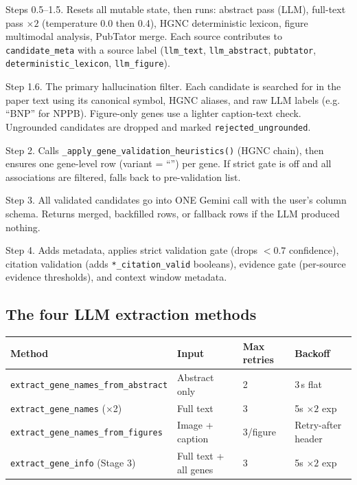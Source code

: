 \documentclass[11pt,a4paper]{article}
\begin{document}
\begin{description}[leftmargin=2em]
\item[\texttt{\_run\_candidate\_discovery()}]
  Steps 0.5--1.5. Resets all mutable state, then runs: abstract pass (LLM), full-text pass $\times 2$ (temperature 0.0 then 0.4), HGNC deterministic lexicon, figure multimodal analysis, PubTator merge. Each source contributes to \texttt{candidate\_meta} with a source label (\texttt{llm\_text}, \texttt{llm\_abstract}, \texttt{pubtator}, \texttt{deterministic\_lexicon}, \texttt{llm\_figure}).

\item[\texttt{\_run\_grounding\_check()}]
  Step 1.6. The primary hallucination filter. Each candidate is searched for in the paper text using its canonical symbol, HGNC aliases, and raw LLM labels (e.g. ``BNP'' for NPPB). Figure-only genes use a lighter caption-text check. Ungrounded candidates are dropped and marked \texttt{rejected\_ungrounded}.

\item[\texttt{\_run\_validation\_and\_normalize()}]
  Step 2. Calls \texttt{\_apply\_gene\_validation\_heuristics()} (HGNC chain), then ensures one gene-level row (variant = ``'') per gene. If strict gate is off and all associations are filtered, falls back to pre-validation list.

\item[\texttt{\_run\_detail\_extraction(column\_descriptions)}]
  Step 3. All validated candidates go into ONE Gemini call with the user's column schema. Returns merged, backfilled rows, or fallback rows if the LLM produced nothing.

\item[\texttt{\_run\_post\_validation(df, ...)}]
  Step 4. Adds metadata, applies strict validation gate (drops $< 0.7$ confidence), citation validation (adds \texttt{*\_citation\_valid} booleans), evidence gate (per-source evidence thresholds), and context window metadata.
\end{description}

\subsection{The four LLM extraction methods}

\begin{center}
\begin{tabular}{llll}
\toprule
\textbf{Method} & \textbf{Input} & \textbf{Max retries} & \textbf{Backoff} \\
\midrule
\texttt{extract\_gene\_names\_from\_abstract} & Abstract only & 2 & 3\,s flat \\
\texttt{extract\_gene\_names} (×2) & Full text & 3 & 5s $\times 2$ exp \\
\texttt{extract\_gene\_names\_from\_figures} & Image + caption & 3/figure & Retry-after header \\
\texttt{extract\_gene\_info} (Stage 3) & Full text + all genes & 3 & 5s $\times 2$ exp \\
\bottomrule
\end{tabular}
\end{center}
\end{document}
